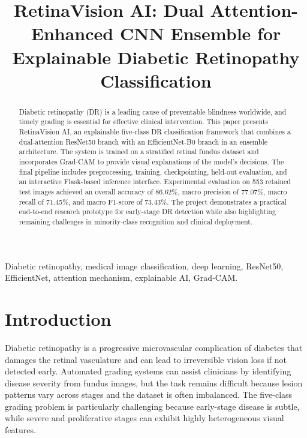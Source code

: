 \documentclass[conference]{IEEEtran}
\begin{document}
\title{RetinaVision AI: Dual Attention-Enhanced CNN Ensemble for Explainable Diabetic Retinopathy Classification}

\author{
}

\maketitle

\begin{abstract}
Diabetic retinopathy (DR) is a leading cause of preventable blindness worldwide, and timely grading is essential for effective clinical intervention. This paper presents RetinaVision AI, an explainable five-class DR classification framework that combines a dual-attention ResNet50 branch with an EfficientNet-B0 branch in an ensemble architecture. The system is trained on a stratified retinal fundus dataset and incorporates Grad-CAM to provide visual explanations of the model's decisions. The final pipeline includes preprocessing, training, checkpointing, held-out evaluation, and an interactive Flask-based inference interface. Experimental evaluation on 553 retained test images achieved an overall accuracy of 86.62\%, macro precision of 77.07\%, macro recall of 71.45\%, and macro F1-score of 73.43\%. The project demonstrates a practical end-to-end research prototype for early-stage DR detection while also highlighting remaining challenges in minority-class recognition and clinical deployment.
\end{abstract}

\begin{IEEEkeywords}
Diabetic retinopathy, medical image classification, deep learning, ResNet50, EfficientNet, attention mechanism, explainable AI, Grad-CAM.
\end{IEEEkeywords}

\section{Introduction}
Diabetic retinopathy is a progressive microvascular complication of diabetes that damages the retinal vasculature and can lead to irreversible vision loss if not detected early. Automated grading systems can assist clinicians by identifying disease severity from fundus images, but the task remains difficult because lesion patterns vary across stages and the dataset is often imbalanced. The five-class grading problem is particularly challenging because early-stage disease is subtle, while severe and proliferative stages can exhibit highly heterogeneous visual features.
\end{document}
